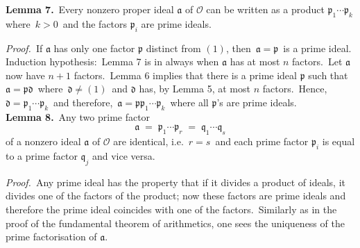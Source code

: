 \documentclass[12pt]{article}
\theoremstyle{definition}
\begin{document}
\textbf{Lemma 7.}\, Every nonzero proper ideal $\mathfrak{a}$ of $\mathcal{O}$ can be written as a product 
$\mathfrak{p}_1\cdots \mathfrak{p}_k$ where\, $k > 0$\, and the factors $\mathfrak{p}_i$ are prime ideals.

\emph{Proof.}\, If $\mathfrak{a}$ has only one factor $\mathfrak{p}$ distinct from $(1)$, then\, $\mathfrak{a} 
= \mathfrak{p}$\, is a prime ideal.\\
Induction hypothesis:\, Lemma 7 is in  always when $\mathfrak{a}$ has at most $n$ factors.\, Let $\mathfrak{a}$ now have $n\!+\!1$ factors.\, Lemma 6 implies that there is a prime ideal $\mathfrak{p}$ such that\, 
$\mathfrak{a = pd}$\, where\, $\mathfrak{d} \neq (1)$\, and $\mathfrak{d}$ has, by Lemma 5, at most $n$ factors.\, Hence,\, $\mathfrak{d} = \mathfrak{p}_1\cdots\mathfrak{p}_k$\, and therefore,\, 
$\mathfrak{a} = \mathfrak{p}\mathfrak{p}_1\cdots\mathfrak{p}_k$\, where all $\mathfrak{p}$'s are prime ideals.\\

\textbf{Lemma 8.}\, Any two prime factor 
$$\mathfrak{a} \;=\; \mathfrak{p}_1\cdots\mathfrak{p}_r \;=\; \mathfrak{q}_1\cdots\mathfrak{q}_s$$
of a nonzero ideal $\mathfrak{a}$ of $\mathcal{O}$ are identical, i.e.\, $r = s$\, and each prime factor $\mathfrak{p}_i$ is equal to a prime factor $\mathfrak{q}_j$ and vice versa.

\emph{Proof.}\, Any prime ideal has the property that if it divides a product of ideals, it divides one of the factors of the product; now these factors are prime ideals and therefore the prime ideal coincides with one of the factors.\, Similarly as in the proof of the fundamental theorem of arithmetics, one sees the uniqueness of the prime factorisation of $\mathfrak{a}$.


\end{document}

